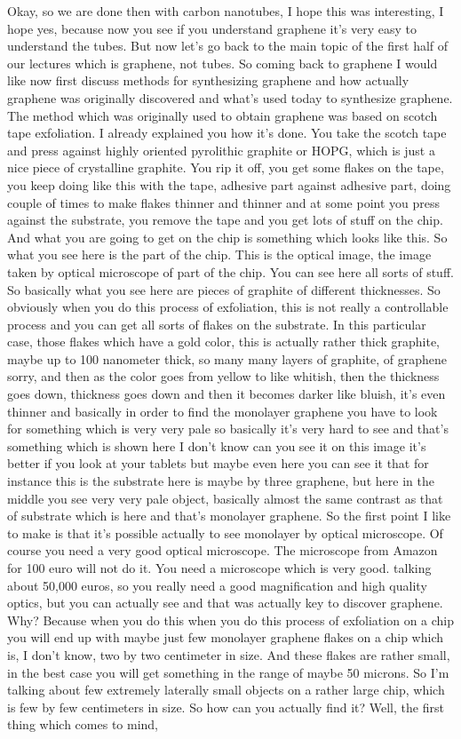 Okay, so we are done then with carbon nanotubes, I hope this was interesting, I hope yes, because now you see if you understand graphene it's very easy to understand the tubes. But now let's go back to the main topic of the first half of our lectures which is graphene, not tubes. So coming back to graphene I would like now first discuss methods for synthesizing graphene and how actually graphene was originally discovered and what's used today to synthesize graphene. The method which was originally used to obtain graphene was based on scotch tape exfoliation. I already explained you how it's done. You take the scotch tape and press against highly oriented pyrolithic graphite or HOPG, which is just a nice piece of crystalline graphite. You rip it off, you get some flakes on the tape, you keep doing like this with the tape, adhesive part against adhesive part, doing couple of times to make flakes thinner and thinner and at some point you press against the substrate, you remove the tape and you get lots of stuff on the chip. And what you are going to get on the chip is something which looks like this. So what you see here is the part of the chip. This is the optical image, the image taken by optical microscope of part of the chip. You can see here all sorts of stuff. So basically what you see here are pieces of graphite of different thicknesses. So obviously when you do this process of exfoliation, this is not really a controllable process and you can get all sorts of flakes on the substrate. In this particular case, those flakes which have a gold color, this is actually rather thick graphite, maybe up to 100 nanometer thick, so many many layers of graphite, of graphene sorry, and then as the color goes from yellow to like whitish, then the thickness goes down, thickness goes down and then it becomes darker like bluish, it's even thinner and basically in order to find the monolayer graphene you have to look for something which is very very pale so basically it's very hard to see and that's something which is shown here I don't know can you see it on this image it's better if you look at your tablets but maybe even here you can see it that for instance this is the substrate here is maybe by three graphene, but here in the middle you see very very pale object, basically almost the same contrast as that of substrate which is here and that's monolayer graphene. So the first point I like to make is that it's possible actually to see monolayer by optical microscope. Of course you need a very good optical microscope. The microscope from Amazon for 100 euro will not do it. You need a microscope which is very good. talking about 50,000 euros, so you really need a good magnification and high quality optics, but you can actually see and that was actually key to discover graphene. Why? Because when you do this when you do this process of exfoliation on a chip you will end up with maybe just few monolayer graphene flakes on a chip which is, I don't know, two by two centimeter in size. And these flakes are rather small, in the best case you will get something in the range of maybe 50 microns. So I'm talking about few extremely laterally small objects on a rather large chip, which is few by few centimeters in size. So how can you actually find it? Well, the first thing which comes to mind, 